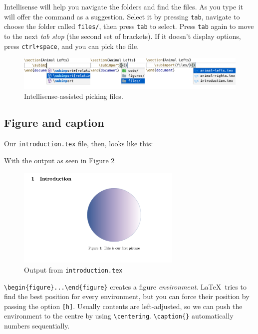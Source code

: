 Intellisense will help you navigate the folders and find the files.
As you type \verb|| it will offer the command as a suggestion.
Select it by pressing \verb|tab|, navigate to choose the folder called \verb|files/|, then press \verb|tab| to select.
Press \verb|tab| again to move to the next \emph{tab stop} (the second set of brackets). If it doesn't display options, press \verb|ctrl+space|, and you can pick the file.
\begin{figure}[h]
    \centering
    \includegraphics[width=\textwidth]{figures/subimport.png}
    \caption{Intellisense-assisted picking files.}
    \label{fig:animal-lefts}
\end{figure}

\subsection{Figure and caption}
Our \verb|introduction.tex| file, then, looks like this:


With the output as seen in Figure \ref{fig:figures}

\begin{figure}[h]
    \centering
        \includegraphics[width=0.7\textwidth]{figures/figures.png}
    \caption{Output from \texttt{introduction.tex}}
    \label{fig:figures}
\end{figure}

\verb|\begin{figure}...\end{figure}| creates a figure \emph{environment}.
\LaTeX\ tries to find the best position for every environment, but you can force their position by passing the option \verb|[h]|.
Usually contents are left-adjusted, so we can push the environment to the centre by using \verb|\centering|.
\verb|\caption{}| automatically numbers sequentially.

